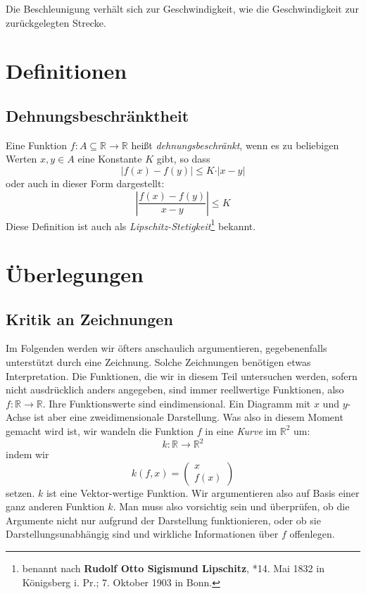 \begin{fancyquotes}
Die Beschleunigung verhält sich zur Geschwindigkeit, wie die Geschwindigkeit zur zurückgelegten Strecke. 
\end{fancyquotes}

\section{Definitionen}

\subsection{Dehnungsbeschränktheit}

\begin{definition}\label{def:lipschitz}
Eine Funktion $f : A \subseteq \mathbb{R} \longrightarrow \mathbb{R}$ heißt \textsl{dehnungsbeschränkt}, wenn es zu beliebigen Werten $x,y\in A$ eine Konstante $K$ gibt, so dass
\[
\left\vert f(x)-f(y)  \right\vert \le K\cdot \vert x-y \vert
\]
oder auch in dieser Form dargestellt:
\[
\left\vert \frac{f(x)-f(y)}{x-y}  \right\vert \le K
\]
Diese Definition ist auch als \textsl{Lipschitz-Stetigkeit}\footnote{benannt nach \textbf{Rudolf Otto Sigismund Lipschitz}, *14. Mai 1832 in Königsberg i. Pr.; 7. Oktober 1903 in Bonn.} bekannt.
\end{definition}


\section{Überlegungen}


\subsection{Kritik an Zeichnungen}

Im Folgenden werden wir öfters anschaulich argumentieren, gegebenenfalls unterstützt durch eine Zeichnung. Solche Zeichnungen benötigen etwas Interpretation. Die Funktionen, die wir in diesem Teil untersuchen werden, sofern nicht ausdrücklich anders angegeben, sind immer reellwertige Funktionen, also $f:\mathbb{R} \longrightarrow \mathbb{R}$. Ihre Funktionswerte sind eindimensional. Ein Diagramm mit $x$ und $y$-Achse ist aber eine zweidimensionale Darstellung. Was also in diesem Moment gemacht wird ist, wir wandeln die Funktion $f$ in eine \textsl{Kurve} im $\mathbb{R}^2$ um:
\[
k : \mathbb{R} \longrightarrow \mathbb{R}^2
\]
indem wir 
\[
k(f,x) = \begin{pmatrix}
x \\
f(x)
\end{pmatrix}
\]
setzen. $k$ ist eine Vektor-wertige Funktion. Wir argumentieren also auf Basis einer ganz anderen Funktion $k$. Man muss also vorsichtig sein und überprüfen, ob die Argumente nicht nur aufgrund der Darstellung funktionieren, oder ob sie Darstellungsunabhängig sind und wirkliche Informationen über $f$ offenlegen. 

